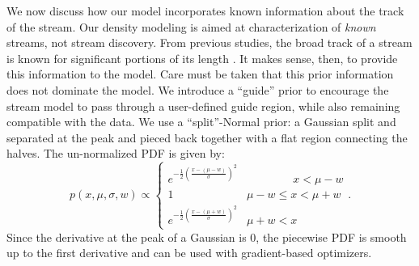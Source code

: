 \documentclass[twocolumn]{aastex631}
\newcommand{\Exp}[1]{e^{#1}}
\newcommand{\pdf}{p}
\begin{document}
            We now discuss how our model incorporates known information about
            the track of the stream.  Our density modeling is aimed at
            characterization of \textit{known} streams, not stream discovery.
            From previous studies, the broad track of a stream is known for
            significant portions of its length \citep[e.g. see the atlas
            in][]{Mateu2022}. It makes sense, then, to provide this information
            to the model. Care must be taken that this prior information does
            not dominate the model.  We introduce a ``guide'' prior to encourage
            the stream model to pass through a user-defined guide region, while
            also remaining compatible with the data.  We use a ``split''-Normal
            prior: a Gaussian split and separated at the peak and pieced back
            together with a flat region connecting the halves.  The
            un-normalized PDF is given by:
            \begin{equation}
                \pdf(x,\mu,\sigma,w) \propto \begin{cases} 
                   \Exp{-\frac{1}{2}\left(\frac{x-(\mu-w)}{\sigma}\right)^2} & \phantom{\mu - w <}\ x < \mu - w \\
                    1 & \mu - w \leq x < \mu + w \\
                    \Exp{-\frac{1}{2}\left(\frac{x-(\mu+w)}{\sigma}\right)^2} & \mu + w < x
                \end{cases}.
            \end{equation}
            Since the derivative at the peak of a Gaussian is $0$, the piecewise
            PDF is smooth up to the first derivative and can be used with
            gradient-based optimizers.
\end{document}
